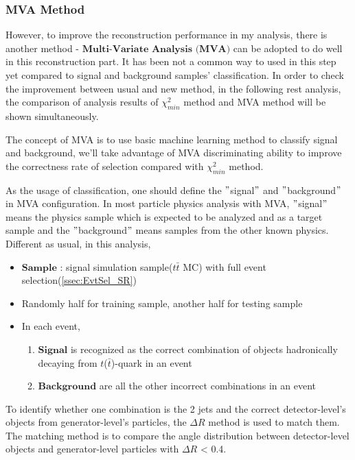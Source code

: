 		\subsubsection{MVA Method}
		\label{sssec:mva_intro} 

			However, to improve the reconstruction performance in my analysis, there is another method - $\textbf{Multi-Variate Analysis (MVA)}$ can be adopted to do well in this reconstruction part. It has been not a common way to used in this step yet compared to signal and background samples' classification. In order to check the improvement between usual and new method, in the following rest analysis, the comparison of analysis results of $\chi^2_{min}$ method and MVA method will be shown simultaneously. 

			The concept of MVA is to use basic machine learning method to classify signal and background, we'll take advantage of MVA discriminating ability to improve the correctness rate of selection compared with $\chi^2_{min}$ method.
				
			As the usage of classification, one should define the $"$signal$"$ and $"$background$"$ in MVA configuration. In most particle physics analysis with MVA, $"$signal$"$ means the physics sample which is expected to be analyzed and as a target sample and the $"$background$"$ means samples from the other known physics. Different as usual, in this analysis,

			\begin{itemize}

				\item $\textbf{Sample}$ : signal simulation sample($t\bar{t}$ MC) with full event selection(\ref{ssec:EvtSel_SR})
				\item Randomly half for training sample, another half for testing sample
				\item In each event,
				\begin{enumerate}
					\item $\textbf{Signal}$ is recognized as the correct combination of objects hadronically decaying from $t$($\bar{t}$)-quark in an event
					\item $\textbf{Background}$ are all the other incorrect combinations in an event
				\end{enumerate}
			\end{itemize}

			To identify whether one combination is the 2 jets and the correct detector-level's objects from generator-level's particles, the $\Delta R$ method is used to match them. The matching method is to compare the angle distribution between detector-level objects and generator-level particles with $\Delta R$ < 0.4. 
			
